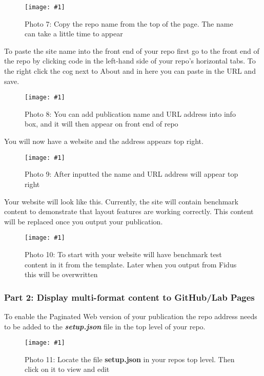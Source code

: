 \documentclass{article}
\newlength{\imgwidth}
\newcommand\scaledgraphics[2]{%
                
\settowidth{\imgwidth}{\texttt{[image: \#1]}}%
                
\setlength{\imgwidth}{\minof{\imgwidth}{#2\textwidth}}%
                
\texttt{[image: \#1]}%
                
}
\begin{document}
\begin{figure}
\scaledgraphics{e77abf83-c7b9-403e-90f1-b338acca85d2.png}{1}
\caption*{Photo 7: Copy the repo name from the top of the page. The name can take a little time to appear}\label{F80988211}
\end{figure}


To paste the site name into the front end of your repo first go to the front end of the repo by clicking code in the left-hand side of your repo's horizontal tabs. To the right click the cog next to About and in here you can paste in the URL and save.

\begin{figure}
\scaledgraphics{f5f93795-0b20-494b-b3e7-4818c0b3c984.png}{1}
\caption*{Photo 8: You can add publication name and URL address into info box, and it will then appear on front end of repo}\label{F81086261}
\end{figure}


You will now have a website and the address appears top right.

\begin{figure}
\scaledgraphics{f8888333-30f3-4d05-bc20-184f811179e6.png}{1}
\caption*{Photo 9: After inputted the name and URL address will appear top right}\label{F34176371}
\end{figure}


Your website will look like this. Currently, the site will contain benchmark content to demonstrate that layout features are working correctly. This content will be replaced once you output your publication.

\begin{figure}
\scaledgraphics{a02a6e92-a533-45d3-a0cd-8cc9019ac1d2.png}{1}
\caption*{Photo 10: To start with your website will have benchmark test content in it from the template. Later when you output from Fidus this will be overwritten}\label{F92674301}
\end{figure}


\subsubsection{Part 2: Display multi-format content to GitHub/Lab Pages}\label{H6708807}



To enable the Paginated Web version of your publication the repo address needs to be added to the \emph{\textbf{setup.json}} file in the top level of your repo.

\begin{figure}
\scaledgraphics{937e8cc0-b575-4ebe-acc3-4faf51c83ced.png}{1}
\caption*{Photo 11: Locate the file \textbf{setup.json} in your repos top level. Then click on it to view and edit}\label{F60164421}
\end{figure}
\end{document}
